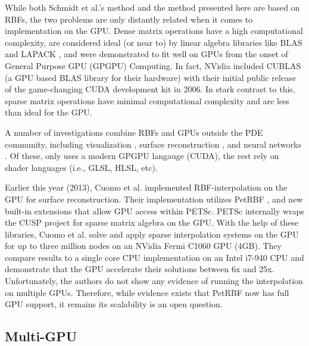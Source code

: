 \documentclass[11pt]{report}
\begin{document}
While both Schmidt et al.'s method and the method presented here are based on RBFs, the two problems are only distantly related when it comes to implementation on the GPU. Dense matrix operations have a high computational complexity, are considered ideal (or near to) by linear algebra libraries like BLAS \cite{BLAS} and LAPACK \cite{Lapack1999}, and were demonstrated to fit well on GPUs from the onset of General Purpose GPU (GPGPU) Computing. In fact, NVidia included CUBLAS \cite{CudaToolkitDoc} (a GPU based BLAS library for their hardware) with their initial public release of the game-changing CUDA development kit in 2006. In stark contrast to this, sparse matrix operations have minimal computational complexity and are less than ideal for the GPU.

A number of investigations combine RBFs and GPUs outside the PDE community, including visualization \cite{Cuntz2007,Weiler2005},  surface reconstruction \cite{Corrigan2005,Carr2003}, and neural networks \cite{Brandstetter2008}. Of these, only \cite{Cuntz2007} uses a modern GPGPU langauge (CUDA), the rest rely on shader languages (i.e., GLSL, HLSL, etc).

Earlier this year (2013), Cuomo et al. \cite{Cuomo2013} implemented RBF-interpolation on the GPU for surface reconstruction. Their implementation utilizes PetRBF \cite{Yokota2010}, and new built-in extensions that allow GPU access within PETSc. PETSc internally wraps the CUSP project \cite{Cusp2012} for sparse matrix algebra on the GPU. With the help of these libraries, Cuomo et al. solve and apply sparse interpolation systems on the GPU for up to three million nodes on an NVidia Fermi C1060 GPU (4GB). They compare results to a single core CPU implementation on an Intel i7-940 CPU and demonstrate that the GPU accelerate their solutions between 6x and 25x. Unfortunately, the authors do not show any evidence of running the interpolation on multiple GPUs. Therefore, while evidence exists that PetRBF now has full GPU support, it remains its scalability is an open question. 



\subsection{Multi-GPU}
\end{document}
